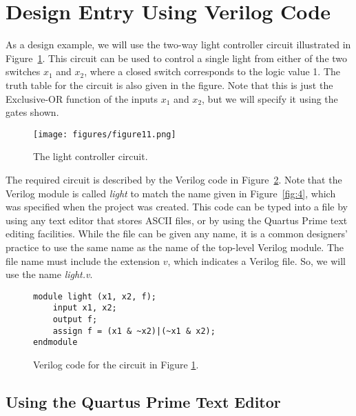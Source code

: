 \section{Design Entry Using Verilog Code}


\noindent
As a design example, we will use the two-way light controller circuit illustrated in 
Figure~\ref{fig:11}. This circuit can be used to control a single light from either of the
two switches $x_1$ and $x_2$, where a closed switch corresponds to the logic value 1.
The truth table for the circuit is also given in the figure. Note that
this is just the Exclusive-OR function of the inputs $x_1$ and $x_2$,
but we will specify it using the gates shown.

\begin{figure}[H]
   \begin{center}
      \texttt{[image: figures/figure11.png]}
   \caption{The light controller circuit.} 
	 \label{fig:11}
	 \end{center}
\end{figure}

The required circuit is described by the Verilog code in Figure~\ref{fig:12}.
Note that the Verilog module is called {\it light} to match the name given in 
Figure~\ref{fig:4}, which was specified when the project was created.
This code can be typed into a file by using any text editor
that stores ASCII files, or by using the Quartus Prime text editing facilities.
While the file can be given any name, it is a common designers' practice to
use the same name as the name of the top-level Verilog module.
The file name must include the extension $v$, which indicates a Verilog
file. So, we will use the name {\it light.v}.

\lstset{language=Verilog}
\begin{figure}[H]
\begin{center}
\begin{minipage}[h]{12.5 cm}
\begin{lstlisting}
module light (x1, x2, f);
	input x1, x2;
	output f;
	assign f = (x1 & ~x2)|(~x1 & x2);
endmodule 
\end{lstlisting}
\end{minipage}
\end{center}
	\caption{Verilog code for the circuit in Figure \ref{fig:11}.}
	\label{fig:12}
\end{figure}

\subsection{Using the Quartus\textsuperscript{\textregistered}	 Prime Text Editor}

